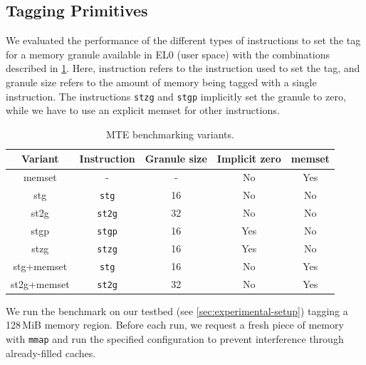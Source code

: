 \subsection{Tagging Primitives}
\label{subsec:tagging-primitives}

We evaluated the performance of the different types of instructions to set the tag for a memory granule available in EL0 (user space) with the combinations described in \cref{tab:stg-instructions}.
Here, instruction refers to the instruction used to set the tag, and granule size refers to the amount of memory being tagged with a single instruction.
The instructions \texttt{stzg} and \texttt{stgp} implicitly set the granule to zero, while we have to use an explicit memset for other instructions.

\begin{table}[h]
    \centering
    \small
    \caption{MTE benchmarking variants.}
    \label{tab:stg-instructions}
    \begin{tabular}{c || c | c | c | c }
        \textbf{Variant} & \textbf{Instruction} & \textbf{Granule size} & \textbf{Implicit zero} & \textbf{memset} \\
        \hline
        memset           & -                    & -                     & No                     & Yes             \\
        stg              & \texttt{stg}         & 16                    & No                     & No              \\
        st2g             & \texttt{st2g}        & 32                    & No                     & No              \\
        stgp             & \texttt{stgp}        & 16                    & Yes                    & No              \\
        stzg             & \texttt{stzg}        & 16                    & Yes                    & No              \\
        stg+memset       & \texttt{stg}         & 16                    & No                     & Yes             \\
        st2g+memset      & \texttt{st2g}        & 32                    & No                     & Yes             \\
    \end{tabular}
\end{table}

We run the benchmark on our testbed (see \cref{sec:experimental-setup}) tagging a 128\,MiB memory region.
Before each run, we request a fresh piece of memory with \texttt{mmap} and run the specified configuration to prevent interference through already-filled caches.

